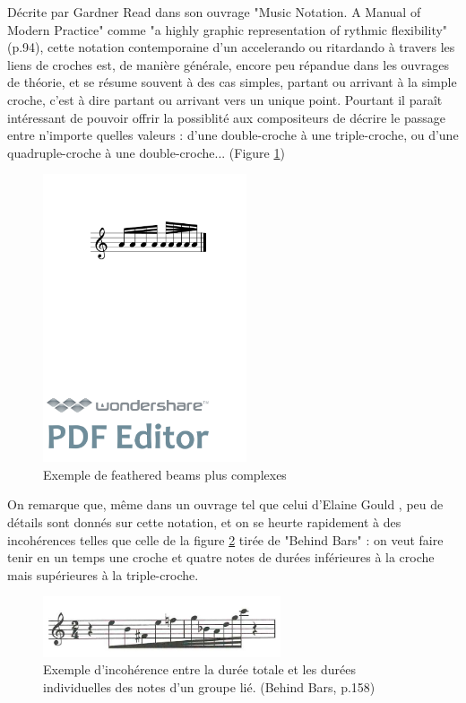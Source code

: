 \documentclass[a4paper,10pt,twocolumn]{article}
\begin{document}
Décrite par Gardner Read dans son ouvrage "Music Notation. A Manual of Modern Practice" \cite{ref8} comme "a highly graphic representation of rythmic flexibility"(p.94), cette notation contemporaine d'un accelerando ou ritardando à travers les liens de croches est, de manière générale, encore peu répandue dans les ouvrages de théorie, et se résume souvent à des cas simples, partant ou arrivant à la simple croche, c'est à dire partant ou arrivant vers un unique point. Pourtant il paraît intéressant de pouvoir offrir la possiblité aux compositeurs de décrire le passage entre n'importe quelles valeurs : d'une double-croche à une triple-croche, ou d'une quadruple-croche à une double-croche... (Figure \ref{fig:fbeamcomplex})

\begin{figure}[h]
\centering
\includegraphics[width=6cm]{img/fbeamcomplex.pdf}
\caption{Exemple de feathered beams plus complexes}
\label{fig:fbeamcomplex}
\end{figure}


On remarque que, même dans un ouvrage tel que celui d'Elaine Gould \cite{ref2}, peu de détails sont donnés sur cette notation, et on se heurte rapidement à des incohérences telles que celle de la figure \ref{fig:incoherence} tirée de "Behind Bars" : on veut faire tenir en un temps une croche et quatre notes de durées inférieures à la croche mais supérieures à la triple-croche. 

\begin{figure}[h]
\centering
\includegraphics[width=7cm]{img/behindbars.jpg}
\caption{Exemple d'incohérence entre la durée totale et les durées individuelles des notes d'un groupe lié. (Behind Bars, p.158) }
\label{fig:incoherence}
\end{figure}
\end{document}
